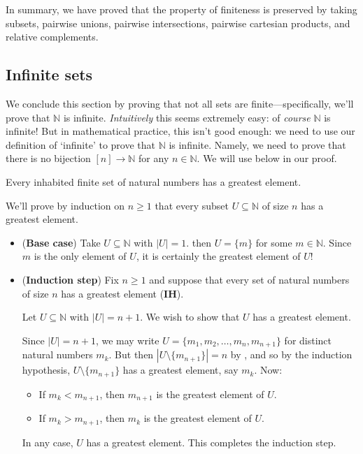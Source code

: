 In summary, we have proved that the property of finiteness is preserved by taking subsets, pairwise unions, pairwise intersections, pairwise cartesian products, and relative complements. 

\subsection*{Infinite sets}

We conclude this section by proving that not all sets are finite---specifically, we'll prove that $\mathbb{N}$ is infinite. \textit{Intuitively} this seems extremely easy: of \textit{course} $\mathbb{N}$ is infinite! But in mathematical practice, this isn't good enough: we need to use our definition of `infinite' to prove that $\mathbb{N}$ is infinite. Namely, we need to prove that there is no bijection $[n] \to \mathbb{N}$ for any $n \in \mathbb{N}$. We will use  below in our proof.

\begin{lemma}
\label{lemFinSetGreatestElement}
Every inhabited finite set of natural numbers has a greatest element.
\end{lemma}
\begin{cproof}
We'll prove by induction on $n \ge 1$ that every subset $U \subseteq \mathbb{N}$ of size $n$ has a greatest element.
\begin{itemize}
\item (\textbf{Base case}) Take $U \subseteq \mathbb{N}$ with $|U|=1$. then $U = \{ m \}$ for some $m \in \mathbb{N}$. Since $m$ is the only element of $U$, it is certainly the greatest element of $U$!

\item (\textbf{Induction step}) Fix $n \ge 1$ and suppose that every set of natural numbers of size $n$ has a greatest element (\textbf{IH}).

Let $U \subseteq \mathbb{N}$ with $|U| = n+1$. We wish to show that $U$ has a greatest element.

Since $|U| = n+1$, we may write $U = \{ m_1, m_2, \dots, m_n, m_{n+1} \}$ for distinct natural numbers $m_k$. But then $|U \setminus \{ m_{n+1} \}| = n$ by , and so by the induction hypothesis, $U \setminus \{ m_{n+1} \}$ has a greatest element, say $m_k$. Now:
\begin{itemize}
\item If $m_k < m_{n+1}$, then $m_{n+1}$ is the greatest element of $U$.
\item If $m_k > m_{n+1}$, then $m_k$ is the greatest element of $U$.
\end{itemize}
In any case, $U$ has a greatest element. This completes the induction step.
\end{itemize}
\end{cproof}

